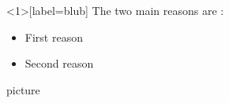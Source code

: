 \documentclass{beamer}
\begin{document}
\begin{frame}<1>[label=blub]
    The two main reasons are : 
    \begin{itemize}
        \item First reason
        \pause 
        \item Second reason
    \end{itemize}
\end{frame}

\begin{frame}[noframenumbering]
    picture
\end{frame}

\end{document}

